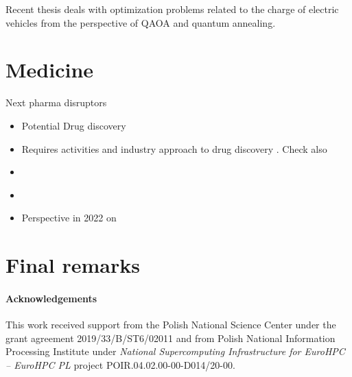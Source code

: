 \documentclass[a4paper,11pt]{article}
\begin{document}
Recent thesis \cite{veshchezerova2022quantum} deals with optimization problems related to the charge of electric vehicles from the perspective of QAOA and quantum annealing.



\section{Medicine}
%

Next pharma disruptors \cite{cova2021artificial}

\begin{itemize}
\item Potential Drug discovery \cite{cao2018potential}
\item Requires activities and industry approach to drug discovery \cite{zinner2022institutionalization}. Check also \cite{zinner2021quantum}
\item  \cite{floether2023state}
%
\item \cite{cordier2022biology}

\item Perspective in 2022 on \cite{blunt2022perspective}
\end{itemize}
\section{Final remarks}



\paragraph{Acknowledgements}
This work received support from the Polish National Science Center under the grant agreement 2019/33/B/ST6/02011 and from Polish National Information Processing Institute  under \emph{National Supercomputing Infrastructure for EuroHPC -- EuroHPC PL} project POIR.04.02.00-00-D014/20-00.



\end{document}
